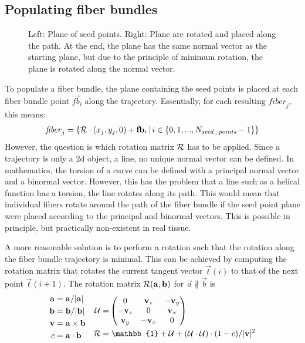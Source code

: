 \subsection{Populating fiber bundles}\label{sec:fillBundle}
%
\begin{figure}[!t]
    \centering
    \setlength{\tikzwidth}{0.75\textwidth}
	\caption{Left: Plane of seed points. Right: Plane are rotated and placed along the path. At the end, the plane has the same normal vector as the starting plane, but due to the principle of minimum rotation, the plane is rotated along the normal vector.}
	\label{fig:torsion}
\end{figure}
%
To populate a fiber bundle, the plane containing the seed points is placed at each fiber bundle point $\vec{fb}_i$ along the trajectory.
Essentially, for each resulting $\mathit{fiber}_j$, this means:
% 
\begin{align}
    \mathit{fiber}_j = \left\{ \mathcal{R} \cdot (x_j, y_j, 0) + \mathbf{fb}_i \, | \, i \in \{0,1,...,N_{\mathit{seed\_points}}-1\}\right\}
\end{align}
% 
However, the question is which rotation matrix $\mathcal{R}$ has to be applied.
Since a trajectory is only a 2d object, \ie{} a line, no unique normal vector can be defined.
In mathematics, the torsion of a curve can be defined with a principal normal vector and a binormal vector.
However, this has the problem that a line such as a helical function has a torsion, \ie{} the line rotates along its path.
This would mean that  individual fibers rotate around the path of the fiber bundle if the seed point plane were placed according to the principal and binormal vectors.
This is possible in principle, but practically non-existent in real tissue.
\par
% 
A more reasonable solution is to perform a rotation such that the rotation along the fiber bundle trajectory is minimal.
This can be achieved by computing the rotation matrix that rotates the current tangent vector $\vec{t}(i)$ to that of the next point $\vec{t}(i+1)$.
The rotation matrix $\mathcal{R}(\mathbf{a}, \mathbf{b})$ for $\vec{a} \nparallel \vec{b}$ is
\begin{align}
\begin{split}
    \vec{a} =& \; \vec{a} / |\vec{a}|\\
    \vec{b} =& \; \vec{b} / |\vec{b}|\\
    \vec{v} =& \; \vec{a} \times \vec{b}\\
    c =& \; \vec{a} \cdot \vec{b}
\end{split}
\quad
\begin{split}
    \mat{U} =& \begin{pmatrix} 0 & \vec{v}_z & -\vec{v}_y\\ -\vec{v}_z & 0 & \vec{v}_x\\ \vec{v}_y & -\vec{v}_x & 0\end{pmatrix}\\
    \mat{R} =& \; \mathbb{1} + \mat{U} + (\mat{U} \cdot \mat{U}) \cdot (1 - c) / |\vec{v}|^2
\end{split}
\end{align}
